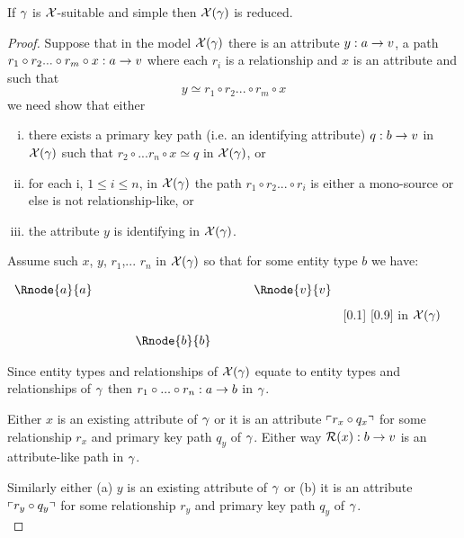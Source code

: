 \begin{lemma}
If $\gamma$ is $\mathcal{X}$-suitable and simple then $\mathcal{X}(\gamma)$ is reduced.
\end{lemma}
\begin{proof}
Suppose that in the model $\mathcal{X}(\gamma)$ there is an attribute $y:a \rightarrow v$, a  path $r_1 \circ r_2 ...\circ r_m \circ x :a \rightarrow v$ where each $r_i$ is a relationship
and $x$ is an attribute and
 such that 
\begin{equation}
\label {reductionequation}
y \simeq r_1 \circ r_2 ...\circ r_m \circ x
\end{equation} 
we need show that either 
\begin{enumerate} [(i)]
\item there exists a primary key path (i.e. an identifying attribute) $q:b \rightarrow v$ in $\mathcal{X}(\gamma)$ such that $r_2 \circ ... r_n \circ x \simeq q$ in $\mathcal{X}(\gamma)$, or
\item for each i, $1 \leq i \leq n$, in $\mathcal{X}(\gamma)$ the path $r_1 \circ r_2 ... \circ r_i$ is either a mono-source or else is not relationship-like, or
\item the attribute $y$ is identifying in $\mathcal{X}(\gamma)$.
\end{enumerate}
Assume such $x$, $y$, $r_1$,... $r_n$ in $\mathcal{X}(\gamma)$ so that for some entity type $b$ we have:

\begin{center}
$
\begin{array}{cp{0.5cm}c p{0.5cm} c}
\Rnode{a}{a} &  &              & & \Rnode{v}{\veee}  \\ [1cm]
             &  & \Rnode{b}{b} & &               
\end{array}
$
[0.1]
[0.9]
 in $\mathcal{X}(\gamma)$
\end{center}


Since entity types and relationships of $\mathcal{X}(\gamma)$ equate to entity types and relationships of $\gamma$ then $r_1 \circ ... \circ r_n : a \rightarrow b$ in $\gamma$.

Either $x$ is an existing attribute of $\gamma$ or it is an attribute $\left\ulcorner r_x \circ q_x\right\urcorner$ for some relationship $r_x$ and primary key path $q_y$ of $\gamma$.
Either way  $\mathcal{R}(x):b \rightarrow v$ is an attribute-like path in $\gamma$. 

Similarly either (a) $y$ is an existing attribute of $\gamma$ or (b) it is an attribute $\left\ulcorner r_y \circ q_y\right\urcorner$ for some relationship $r_y$ and primary key path $q_y$ of $\gamma$. \\



\end{proof}
